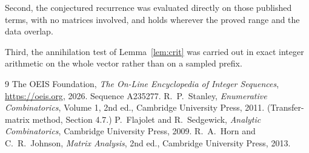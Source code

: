 \documentclass[11pt,a4paper]{article}
\theoremstyle{plain}
\theoremstyle{definition}
\begin{document}
Second, the conjectured recurrence was evaluated directly on those published terms, with no
matrices involved, and holds wherever the proved range and the data overlap.

Third, the annihilation test of Lemma~\ref{lem:crit} was carried out in exact integer
arithmetic on the whole vector rather than on a sampled prefix.

\begin{thebibliography}{9}
 The OEIS Foundation, \emph{The On-Line Encyclopedia of Integer
Sequences}, \url{https://oeis.org}, 2026. Sequence A235277.
 R.~P.~Stanley, \emph{Enumerative Combinatorics}, Volume 1, 2nd ed.,
Cambridge University Press, 2011. (Transfer-matrix method, Section 4.7.)
 P.~Flajolet and R.~Sedgewick, \emph{Analytic Combinatorics}, Cambridge
University Press, 2009.
 R.~A.~Horn and C.~R.~Johnson, \emph{Matrix Analysis}, 2nd ed., Cambridge
University Press, 2013.
\end{thebibliography}
\end{document}
